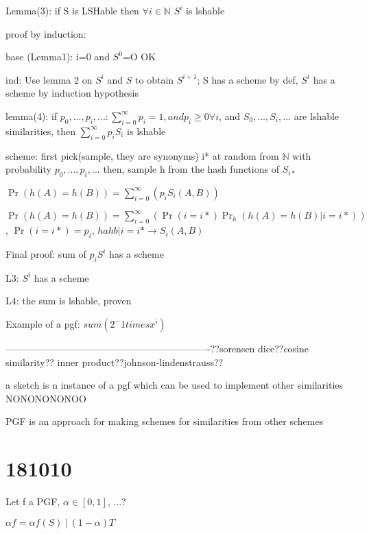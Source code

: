 \documentclass{report}
\begin{document}
	
	Lemma(3): if S is LSHable then $\forall i \in \mathbb{N}$ $S^i$ is lshable
	
	proof by induction:
	
	base (Lemma1): i=0 and $S^0$=O OK
	
	ind: Use lemma 2 on $S^i$ and $S$ to obtain $S^{i+1}$; S has a scheme by def, $S^i$ has a scheme by induction hypothesis
	
	
	lemma(4): if $p_0, ..., p_i, ... : \sum_{i=0}^{\infty}p_i=1 , and p_i\geq 0 \forall i$, and $S_0, ..., S_i, ...$ are lshable similarities, then $\sum_{i=0}^{\infty}p_iS_i$ is lshable
	
	scheme: first pick(sample, they are synonyms) i* at random from $\mathbb{N}$ with probability $p_0, ..., p_i, ...$
	then, sample h from the hash functions of $S_{i*}$
	
	$\Pr(h(A)=h(B))=\sum_{i=0}^{\infty}(p_i S_i(A, B))$
	
	$\Pr(h(A)=h(B))=\sum_{i=0}^{\infty}(\Pr(i=i*)\Pr_h(h(A)=h(B) | i=i*))$, $\Pr(i=i*) = p_i$, $hahb|i=i* \to S_i(A, B)$
	
	
	Final proof: sum of $p_iS^i$ has a scheme
	
	L3: $S^i$ has a scheme
	
	L4: the sum is lshable, proven
	
	
	Example of a pgf: $sum(2^-1 times x^i)$
	
	
	----------------------------------------------------------------??sorensen dice??cosine similarity?? inner product??johnson-lindenstrauss??
	
	a sketch is n instance of a pgf which can be used to implement other similarities NONONONONOO
	
	
	
	PGF is an approach for making schemes for similarities from other schemes
	
	\section{181010}
	
	Let f a PGF, $\alpha \in [0, 1]$, ...?
	
	$\alpha f = \alpha f(S)\ |\ (1 - \alpha)T$
	
\end{document}
